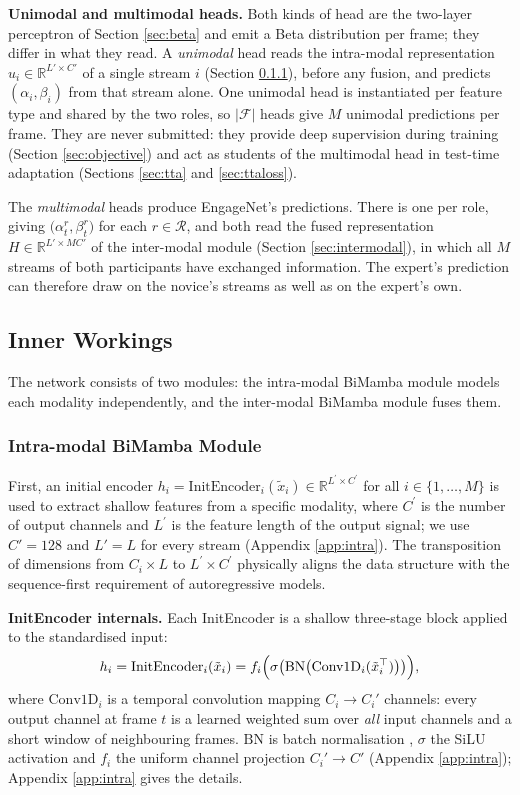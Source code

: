 \documentclass[10pt,a4paper,twocolumn]{article}
\newcommand{\R}{\mathbb{R}}
\begin{document}
	\textbf{Unimodal and multimodal heads.} Both kinds of head are the two-layer perceptron of Section \ref{sec:beta} and emit a Beta distribution per frame; they differ in what they read. A \emph{unimodal} head reads the intra-modal representation $u_i \in \R^{L' \times C'}$ of a single stream $i$ (Section \ref{sec:intramodal}), before any fusion, and predicts $(\alpha_i, \beta_i)$ from that stream alone. One unimodal head is instantiated per feature type and shared by the two roles, so $|\mathcal{F}|$ heads give $M$ unimodal predictions per frame. They are never submitted: they provide deep supervision during training (Section \ref{sec:objective}) and act as students of the multimodal head in test-time adaptation (Sections \ref{sec:tta} and \ref{sec:ttaloss}).

	The \emph{multimodal} heads produce EngageNet's predictions. There is one per role, giving $\bigl(\alpha_t^{r}, \beta_t^{r}\bigr)$ for each $r \in \mathcal{R}$, and both read the fused representation $H \in \R^{L' \times MC'}$ of the inter-modal module (Section \ref{sec:intermodal}), in which all $M$ streams of both participants have exchanged information. The expert's prediction can therefore draw on the novice's streams as well as on the expert's own.
	
	\subsection{Inner Workings}
	The network consists of two modules: the intra-modal BiMamba module models each modality independently, and the inter-modal BiMamba module fuses them.
	
	\subsubsection{Intra-modal BiMamba Module}
	\label{sec:intramodal}
	First, an initial encoder $h_{i} = \text{InitEncoder}_{i}(\tilde{x}_{i}) \in \R^{L^{\prime}\times C^{\prime}}$ for all $i\in\{1,\dots,M\}$ is used to extract shallow features from a specific modality, where $C^{\prime}$ is the number of output channels and $L^{\prime}$ is the feature length of the output signal; we use $C' = 128$ and $L' = L$ for every stream (Appendix \ref{app:intra}). The transposition of dimensions from $C_i \times L$ to $L^{\prime} \times C^{\prime}$ physically aligns the data structure with the sequence-first requirement of autoregressive models.
	
	\textbf{InitEncoder internals.} Each InitEncoder is a shallow three-stage block applied to the standardised input:
	$$h_i = \text{InitEncoder}_i(\tilde{x}_i) = f_i\Bigl(\sigma\bigl(\text{BN}\bigl(\text{Conv1D}_i(\tilde{x}_i^{\top})\bigr)\bigr)\Bigr),$$ where $\text{Conv1D}_i$ is a temporal convolution mapping $C_i \to C_i'$ channels: every output channel at frame $t$ is a learned weighted sum over \emph{all} input channels and a short window of neighbouring frames. $\text{BN}$ is batch normalisation \cite{ioffe2015batchnorm}, $\sigma$ the SiLU activation and $f_i$ the uniform channel projection $C_i' \to C'$ (Appendix \ref{app:intra}); Appendix \ref{app:intra} gives the details.
\end{document}
